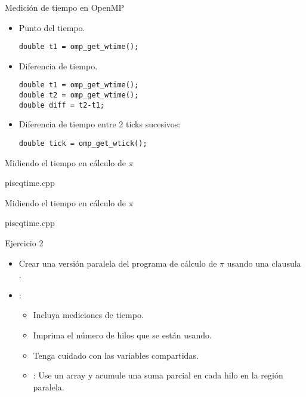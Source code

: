 \begin{frame}[t,fragile]{Medición de tiempo en OpenMP}
\begin{itemize}

\item Punto del tiempo.
\begin{lstlisting}
double t1 = omp_get_wtime();
\end{lstlisting}

\item Diferencia de tiempo.
\begin{lstlisting}
double t1 = omp_get_wtime();
double t2 = omp_get_wtime();
double diff = t2-t1;
\end{lstlisting}

\item Diferencia de tiempo entre 2 ticks sucesivos:
\begin{lstlisting}
double tick = omp_get_wtick();
\end{lstlisting}

\end{itemize}
\end{frame}

\begin{frame}[t]{Midiendo el tiempo en cálculo de $\pi$}
\begin{block}{piseqtime.cpp}

\end{block}
\end{frame}

\begin{frame}[t]{Midiendo el tiempo en cálculo de $\pi$}
\begin{block}{piseqtime.cpp}

\end{block}
\end{frame}

\begin{frame}[t]{Ejercicio 2}
\begin{itemize}
\item Crear una versión paralela del programa de cálculo de $\pi$ usando
      una clausula .

\item {}:
  \begin{itemize}
    \item Incluya mediciones de tiempo.
    \item Imprima el número de hilos que se están usando.
    \item Tenga cuidado con las variables compartidas.
    \item {}: Use un array y acumule una suma parcial en cada hilo en la región paralela.
  \end{itemize}
\end{itemize}
\end{frame}
